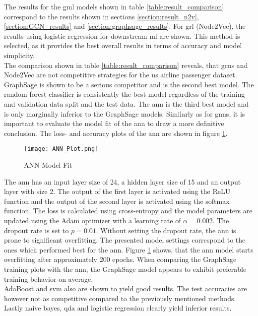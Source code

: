   \noindent The results for the \acs{gml} models shown in table 
  \ref{table:result_comparison} correspond to the results shown in sections
  \ref{section:result_n2v}, \ref{section:GCN_results} and 
  \ref{section:graphsage_results}. For \acs{grl} (Node2Vec), the results using 
  logistic regression for downstream \acs{ml} are shown. This method is selected, 
  as it provides the best overall results in terms of accuracy and model simplicity. \\

  \noindent The comparison shown in table \ref{table:result_comparison} reveals,
  that \acsp{gcn} and Node2Vec are not competitive strategies for the \acs{us} 
  airline passenger dataset. GraphSage is shown to be a serious competitor and 
  is the second best model. The random forest classifier is consistently the best 
  model regardless of the training- and validation data split and the test data. 
  The \acs{ann} is the third best model and is only marginally inferior to the
  GraphSage models. Similarly as for \acsp{gnn}, it is important to evaluate the 
  model fit of the \acs{ann} to draw a more definitive conclusion. The loss- and
  accuracy plots of the \acs{ann} are shown in figure \ref{fig:ANN_fit}.

  \begin{figure}[h]
		\centering
		\texttt{[image: ANN\_Plot.png]}
		\caption{ANN Model Fit}
        \label{fig:ANN_fit}
  \end{figure}

  \noindent The \acs{ann} has an input layer size of 24, a hidden layer size of 
  15 and an output layer with size 2. The output of the first layer is activated
  using the ReLU function and the output of the second layer is activated
  using the softmax function. The loss is calculated using cross-entropy and
  the model parameters are updated using the Adam optimizer with a learning
  rate of $\alpha=0.002$. The dropout rate is set to $p=0.01$. Without setting 
  the dropout rate, the \acs{ann} is prone to significant overfitting. The 
  presented model settings correspond to the ones which performed best for the 
  \acs{ann}. Figure \ref{fig:ANN_fit} shows, that the \acs{ann} model starts 
  overfitting after approximately 200 epochs. When comparing the GraphSage 
  training plots with the \acs{ann}, the GraphSage model appears to exhibit 
  preferable training behavior on average. \\

  \noindent AdaBoost and \acs{svm} also are shown to yield good results. The test
  accuracies are however not as competitive compared to the previously
  mentioned methods. Lastly naive bayes, \acs{qda} and logistic regression clearly
  yield inferior results. 
